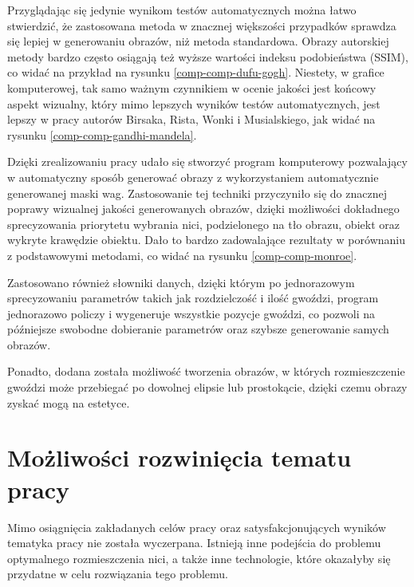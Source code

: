 \documentclass[a4paper, 12pt, polish, twoside]{extreport}
\begin{document}
    Przyglądając się jedynie wynikom testów automatycznych można łatwo stwierdzić, że zastosowana metoda w znacznej większości przypadków sprawdza się lepiej w generowaniu obrazów, niż metoda standardowa. Obrazy autorskiej metody bardzo często osiągają też wyższe wartości indeksu podobieństwa (SSIM), co widać na przykład na rysunku \ref{comp-comp-dufu-gogh}. Niestety, w grafice komputerowej, tak samo ważnym czynnikiem w ocenie jakości jest końcowy aspekt wizualny, który mimo lepszych wyników testów automatycznych, jest lepszy w pracy autorów Birsaka, Rista, Wonki i Musialskiego, jak widać na rysunku \ref{comp-comp-gandhi-mandela}.
    
    Dzięki zrealizowaniu pracy udało się stworzyć program komputerowy pozwalający w automatyczny sposób generować obrazy z wykorzystaniem automatycznie generowanej maski wag. Zastosowanie tej techniki przyczyniło się do znacznej poprawy wizualnej jakości generowanych obrazów, dzięki możliwości dokładnego sprecyzowania priorytetu wybrania nici, podzielonego na tło obrazu, obiekt oraz wykryte krawędzie obiektu. Dało to bardzo zadowalające rezultaty w porównaniu z podstawowymi metodami, co widać na rysunku \ref{comp-comp-monroe}. 
    
    Zastosowano również słowniki danych, dzięki którym po jednorazowym sprecyzowaniu parametrów takich jak rozdzielczość i ilość gwoździ, program jednorazowo policzy i wygeneruje wszystkie pozycje gwoździ, co pozwoli na późniejsze swobodne dobieranie parametrów oraz szybsze generowanie samych obrazów.
    
    Ponadto, dodana została możliwość tworzenia obrazów, w których rozmieszczenie gwoździ może przebiegać po dowolnej elipsie lub prostokącie, dzięki czemu obrazy zyskać mogą na estetyce.
    
    \section{Możliwości rozwinięcia tematu pracy}
    Mimo osiągnięcia zakładanych celów pracy oraz satysfakcjonujących wyników tematyka pracy nie została wyczerpana. Istnieją inne podejścia do problemu optymalnego rozmieszczenia nici, a także inne technologie, które okazałyby się przydatne w celu rozwiązania tego problemu. 
    
\end{document}
